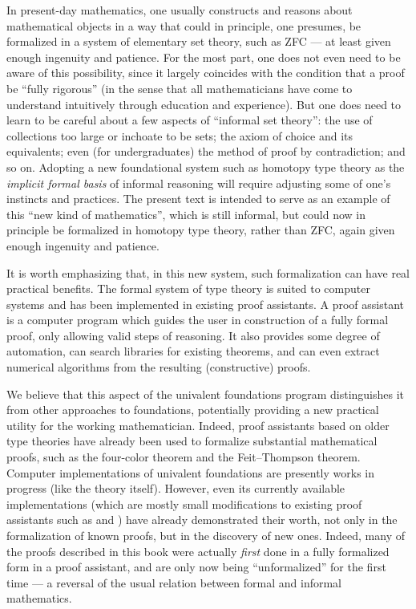 In present-day mathematics, one usually constructs and reasons about mathematical objects in a way that could in principle, one presumes, be formalized in a system of elementary set theory, such as ZFC --- at least given enough ingenuity and patience.
For the most part, one does not even need to be aware of this possibility, since it largely coincides with the condition that a proof be ``fully rigorous'' (in the sense that all mathematicians have come to understand intuitively through education and experience).
But one does need to learn to be careful about a few aspects of ``informal set theory'': the use of collections too large or inchoate to be sets; the axiom of choice and its equivalents; even (for undergraduates) the method of proof by contradiction; and so on.
Adopting a new foundational system such as homotopy type theory as the \emph{implicit formal basis} of informal reasoning will require adjusting some of one's instincts and practices.
The present text is intended to serve as an example of this ``new kind of mathematics'', which is still informal, but could now in principle be formalized in homotopy type theory, rather than ZFC, again given enough ingenuity and patience.

It is worth emphasizing that, in this new system, such formalization can have real practical benefits.
The formal system of type theory is suited to computer systems and has been implemented in existing proof assistants.
%
A proof assistant is a computer program which guides the user in construction of a fully formal proof, only allowing valid steps of reasoning.
It also provides some degree of automation, can search libraries for existing theorems, and can even extract numerical algorithms from the resulting (constructive) proofs.

We believe that this aspect of the univalent foundations program distinguishes it from other approaches to foundations, potentially providing a new practical utility for the working mathematician.
Indeed, proof assistants based on older type theories have already been used to formalize substantial mathematical proofs, such as the four-color theorem and the Feit--Thompson theorem.
Computer implementations of univalent foundations are presently works in progress (like the theory itself).
However, even its currently available implementations (which are mostly small modifications to existing proof assistants such as \Coq and 
\Agda) have already demonstrated their worth, not only in the formalization of known proofs, but in the discovery of new ones.
Indeed, many of the proofs described in this book were actually \emph{first} done in a fully formalized form in a proof assistant, and are only now being ``unformalized'' for the first time --- a reversal of the usual relation between formal and informal mathematics.

